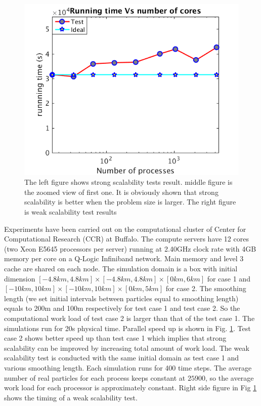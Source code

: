 \documentclass[procedia]{easychair}
\begin{document}
\begin{figure}[!t]
\includegraphics[scale=0.31]{weak_scale}
\caption{The left figure shows strong scalability tests result. middle figure is the zoomed view of first one. It is obviously shown that strong scalability is better when the problem size is larger. The right figure is weak scalability test results}
\label{fig:2cases_efficiency}
\end{figure}
%
Experiments have been carried out on the computational cluster of Center for Computational Research (CCR) at Buffalo. 
The compute servers have 12 cores (two Xeon E5645 processors per server) running at 2.40GHz clock rate with 4GB memory per core on a Q-Logic Infiniband network. Main memory and level 3 cache are shared on each node. The simulation domain is a box with initial dimension $[-4.8km, 4.8km]\times [-4.8km, 4.8km] \times [0km, 6km]$ for case 1 and $[-10km, 10km]\times [-10km, 10km] \times [0km, 5km]$ for case 2. The smoothing length (we set initial intervals between particles equal to smoothing length) equals to 200m and 100m respectively for test case 1 and test case 2. So the computational work load of test case 2 is larger than that of the test case 1. The simulations run for 20s physical time.  Parallel speed up is shown in Fig. \ref{fig:2cases_efficiency}. Test case 2 shows better speed up than test case 1 which implies that strong scalability can be improved by increasing total amount of work load.
The weak scalability test is conducted with the same initial domain as test case 1 and various smoothing length. Each simulation runs for 400 time steps. The average number of real particles for each process keeps constant at $25900$, so the average work load for each processor is approximately constant. 
Right side figure in Fig \ref{fig:2cases_efficiency} shows the timing of a weak scalability test.\\
\end{document}

